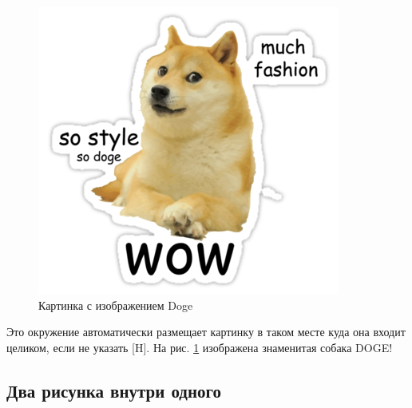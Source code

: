 \documentclass[12pt, a4paper]{article}
\begin{document}
\begin{figure}[H]
\begin{center}
\includegraphics[width=0.3\textheight]{doge.png}
\end{center}
\caption{Картинка с изображением Doge}\label{pic:doge}
\end{figure}

Это окружение автоматически размещает картинку в таком месте куда она входит целиком, если не указать [H].  На рис. \ref{pic:doge} изображена знаменитая собака DOGE!


\subsection{Два рисунка внутри одного}
\end{document}
